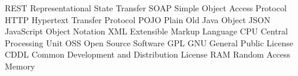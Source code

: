 	{REST}	{Representational State Transfer}
	{SOAP}	{Simple Object Access Protocol}
	{HTTP}	{Hypertext Transfer Protocol}
	{POJO}	{Plain Old Java Object}
	{JSON}	{JavaScript Object Notation}
	{XML}	{Extensible Markup Language}
	{CPU}	{Central Processing Unit}
	{OSS}	{Open Source Software}
	{GPL}	{GNU General Public License}
	{CDDL}	{Common Development and Distribution License}
	{RAM}	{Random Access Memory}

